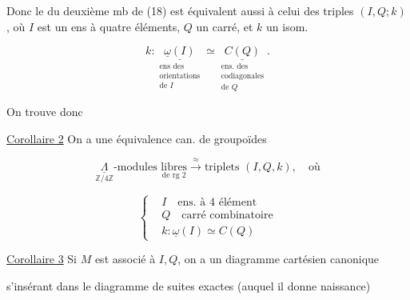 Donc le   du deuxième mb de (18) est équivalent aussi à celui des triples $(I,Q;k)$, où $I$ est un ens à quatre éléments, $Q$ un carré, et $k$ un isom.

\[
 k:\underset{\substack{\text{ens des}\\\text{orientations}\\\text{de }I}}{\underline{\underline\omega(I)}}\simeq
 \underset{\substack{\text{ens. des}\\\text{codiagonales}\\\text{de }Q}}{\underline{C(Q)}}. \tag*{(20)}
\]

On trouve donc

\uline{Corollaire 2} On a une équivalence can. de groupoïdes

\[
\underset{\mathbb Z/4\mathbb Z}{\underline\Lambda}\text{-modules }\underset{\text{de rg }2}{\text{libres}}
\xrightarrow{\approx}\text{triplets }(I,Q,k),\quad\text{où} \tag*{(21)}
\]

\[
\left\{\begin{aligned}
&I\quad\text{ens. à }4\text{ élément}\\
&Q\quad\text{carré combinatoire}\\
&k:\underline\omega(I)\simeq C(Q)
\end{aligned}\right.
\]

\uline{Corollaire 3} Si $M$ est associé à $I,Q$, on a un diagramme cartésien canonique

s'insérant dans le diagramme de suites exactes (auquel il donne naissance)


